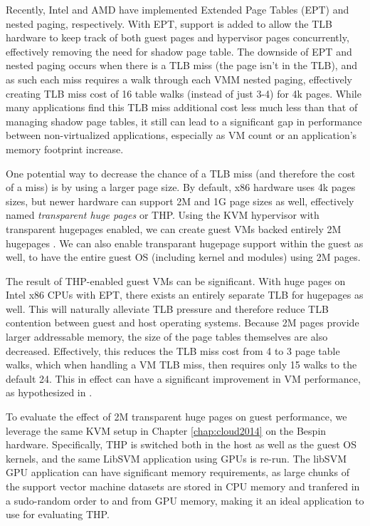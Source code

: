 Recently, Intel and AMD have implemented Extended Page Tables (EPT) and nested paging, respectively.  With EPT, support is added to allow the TLB hardware to keep track of both guest pages and hypervisor pages concurrently, effectively removing the need for shadow page table. The downside of EPT and nested paging occurs when there is a TLB miss (the page isn't in the TLB), and as such each miss requires a walk through each VMM nested paging, effectively creating TLB miss cost of 16 table walks (instead of just 3-4) for 4k pages. While many applications find this TLB miss additional cost less much less than that of managing shadow page tables, it still can lead to a significant gap in performance between non-virtualized applications, especially as VM count or an application's memory footprint increase. 

One potential way to decrease the chance of a TLB miss (and therefore the cost of a miss) is by using a larger page size. By default, x86 hardware uses 4k pages sizes, but newer hardware can support 2M and 1G page sizes as well, effectively named \emph{transparent huge pages} or THP.  Using the KVM hypervisor with transparent hugepages enabled, we can create guest VMs backed entirely 2M hugepages \cite{Arcangeli:2010}. We can also enable transparant hugepage support within the guest as well, to have the entire guest OS (including kernel and modules) using 2M pages. 

The result of THP-enabled guest VMs can be significant. With huge pages on Intel x86 CPUs with EPT, there exists an entirely separate TLB for hugepages as well. This will naturally alleviate TLB pressure and therefore reduce TLB contention between guest and host operating systems. Because 2M pages provide larger addressable memory, the size of the page tables themselves are also decreased.  Effectively, this reduces the TLB miss cost from 4 to 3 page table walks, which when handling a VM TLB miss, then requires only 15 walks to the default 24. This in effect can have a significant improvement in VM performance, as hypothesized in \cite{Arcangeli:2010}.

To evaluate the effect of 2M transparent huge pages on guest performance, we leverage the same KVM setup in Chapter \ref{chap:cloud2014} on the Bespin hardware. Specifically, THP is switched both in the host as well as the guest OS kernels, and the same LibSVM application using GPUs is re-run. The libSVM GPU application can have significant memory requirements, as large chunks of the support vector machine datasets are stored in CPU memory and tranfered in a sudo-random order to and from GPU memory, making it an ideal application to use for evaluating THP.



